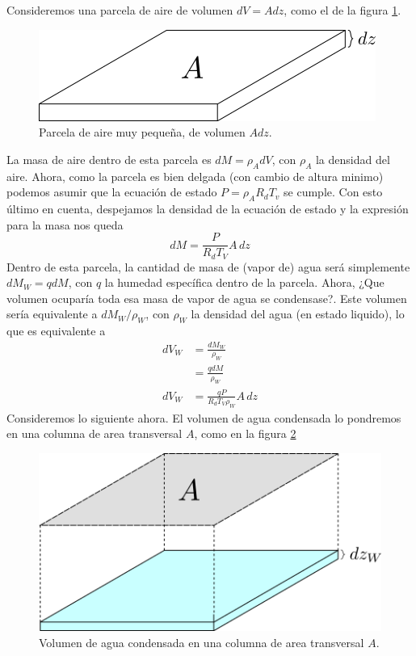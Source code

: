 \documentclass[class=article, crop=false]{standalone}
\begin{document}
Consideremos una parcela de aire de volumen $dV=Adz$, como el de la figura \ref{dV}.
\begin{figure}
   \centering
   \vspace{5mm}
   \includegraphics[width=0.5\linewidth]{dV.png}
   \caption{Parcela de aire muy pequeña, de volumen $Adz$.}
   \label{dV}
\end{figure}

La masa de aire dentro de esta parcela es $dM = \rho_A dV$, con $\rho_A$ la densidad del aire. Ahora, como la parcela es bien delgada (con cambio de altura minimo) podemos asumir que la ecuación de estado $P = \rho_A R_d T_v$ se cumple. Con esto último en cuenta, despejamos la densidad de la ecuación de estado y la expresión para la masa nos queda
\begin{equation}
    dM = \frac{P}{R_dT_V}A\,dz \label{dM}
\end{equation}
Dentro de esta parcela, la cantidad de masa de (vapor de) agua será simplemente $dM_W = qdM$, con $q$ la humedad específica dentro de la parcela. Ahora, ¿Que volumen ocuparía toda esa masa de vapor de agua se condensase?. Este volumen sería equivalente a $dM_W/\rho_W$, con $\rho_W$ la densidad del agua (en estado liquido), lo que es equivalente a  
\begin{align*}
    dV_W &= \frac{dM_W}{\rho_W}\\
         &= \frac{qdM}{\rho_W}\\
    dV_W &= \frac{qP}{R_dT_V \rho_W}A\,dz \label{dMW}
\end{align*}
Consideremos lo siguiente ahora. El volumen de agua condensada lo pondremos en una columna de area transversal $A$, como en la figura \ref{dVW}
\begin{figure}
    \centering
    \vspace{3mm}
    \includegraphics[width=0.52\linewidth]{dVW.png}
    \caption{Volumen de agua condensada en una columna de area transversal $A$.}
    \label{dVW}
\end{figure}
\end{document}

